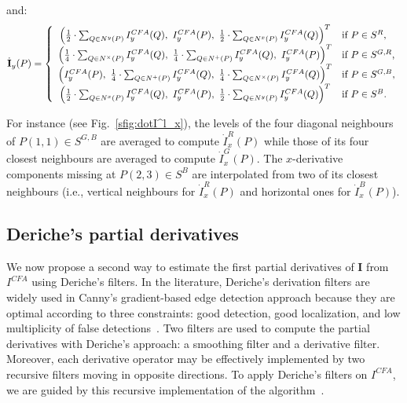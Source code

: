 \documentclass[twoside]{article}
\begin{document}
\noindent and:
\begin{equation}
	\dot{\textbf{I}}_y(P) = \left\lbrace
	\begin{array}{cl}
		\left( \frac{1}{2}\cdot\sum_{Q \in N^{y}(P)} I^{CFA}_y(Q),~I^{CFA}_y(P),~\frac{1}{2}\cdot\sum_{Q \in N^{x}(P)} I^{CFA}_y(Q) \right)^T & \text{if $P \in S^R$,} \\
		\left( \frac{1}{4}\cdot\sum_{Q \in N^{\times}(P)} I^{CFA}_y(Q),~\frac{1}{4}\cdot\sum_{Q \in N^{+}(P)} I^{CFA}_y(Q),~I^{CFA}_y(P) \right)^T & \text{if $P \in S^{G,R}$,}\\
		\left( I^{CFA}_y(P),~\frac{1}{4}\cdot\sum_{Q \in N^{+}(P)} I^{CFA}_y(Q),~\frac{1}{4}\cdot\sum_{Q \in N^{\times}(P)} I^{CFA}_y(Q) \right)^T & \text{if $P \in S^{G,B}$,}\\
		\left( \frac{1}{2}\cdot\sum_{Q \in N^{x}(P)} I^{CFA}_y(Q),~I^{CFA}_y(P),~\frac{1}{2}\cdot\sum_{Q \in N^{y}(P)} I^{CFA}_y(Q) \right)^T & \text{if $P \in S^B$.}
	\end{array}\right.
	\label{eq:I_p_y_full}
\end{equation}

\noindent For instance (see Fig.~\ref{sfig:dotI^l_x}), the levels of the four diagonal neighbours of $P(1,1) \in S^{G,B}$ are averaged to compute $\dot{I}^R_x(P)$ while those of its four closest neighbours are averaged to compute $\dot{I}^G_x(P)$. The $x$-derivative components missing at $P(2,3) \in S^B$  are interpolated from two of its closest neighbours (i.e., vertical neighbours for $\dot{I}^R_x(P)$ and horizontal ones for $\dot{I}^B_x(P)$).


\subsection{Deriche's partial derivatives}
\label{Deriche partial derivatives}



We now propose a second way to estimate the first partial derivatives of $\mathbf{I}$ from $I^{CFA}$ using Deriche's filters. In the literature, Deriche's derivation filters are widely used in Canny's gradient-based edge detection approach because they are optimal according to three constraints: good detection, good localization, and low multiplicity of false detections~\cite{deriche_ijcv_1987}.
Two filters are used to compute the partial derivatives with Deriche's approach: a smoothing filter and a derivative filter. 
Moreover, each derivative operator may be effectively implemented by two recursive filters moving in opposite directions. To apply Deriche's filters on $I^{CFA}$, we are guided by this recursive implementation of the algorithm~\cite{deriche_ieeetpami_1990}.
\end{document}
